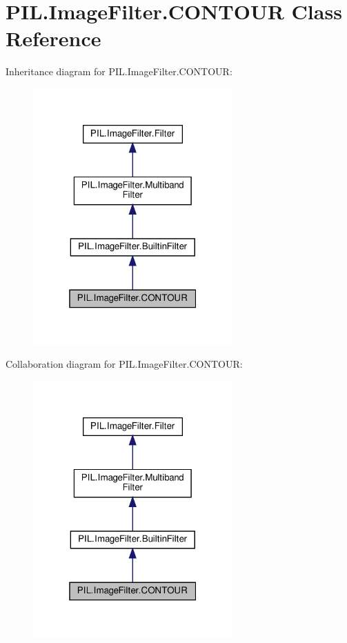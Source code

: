 \hypertarget{classPIL_1_1ImageFilter_1_1CONTOUR}{}\section{P\+I\+L.\+Image\+Filter.\+C\+O\+N\+T\+O\+UR Class Reference}
\label{classPIL_1_1ImageFilter_1_1CONTOUR}


Inheritance diagram for P\+I\+L.\+Image\+Filter.\+C\+O\+N\+T\+O\+UR\+:
\nopagebreak
\begin{figure}[H]
\begin{center}
\leavevmode
\includegraphics[width=217pt]{classPIL_1_1ImageFilter_1_1CONTOUR__inherit__graph}
\end{center}
\end{figure}


Collaboration diagram for P\+I\+L.\+Image\+Filter.\+C\+O\+N\+T\+O\+UR\+:
\nopagebreak
\begin{figure}[H]
\begin{center}
\leavevmode
\includegraphics[width=217pt]{classPIL_1_1ImageFilter_1_1CONTOUR__coll__graph}
\end{center}
\end{figure}
